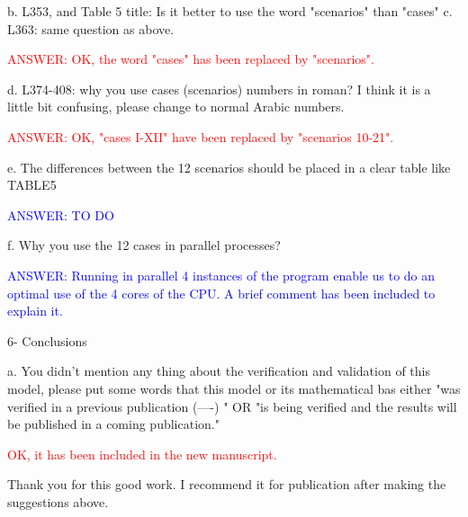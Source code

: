 \documentclass[a4paper]{article}
\begin{document}
b. L353, and Table 5 title: Is it better to use the word "scenarios" than "cases"
c. L363: same question as above.

\textcolor{red}{ANSWER: OK, the word "cases" has been replaced by "scenarios".}

d. L374-408: why you use cases (scenarios) numbers in roman? I think it is a little bit confusing, please change to normal Arabic numbers.

\textcolor{red}{ANSWER: OK, "cases I-XII" have been replaced by "scenarios
10-21".}

e. The differences between the 12 scenarios should be placed in a clear table like TABLE5

\textcolor{blue}{ANSWER: TO DO}

f. Why you use the 12 cases in parallel processes?

\textcolor{blue}{ANSWER: Running in parallel 4 instances of the program enable
us to do an optimal use of the 4 cores of the CPU. A brief comment has been
included to explain it.}

6- Conclusions

a. You didn't mention any thing about the verification and validation of this model, please put some words that this model or its mathematical bas either "was verified in a previous publication (----) " OR "is being verified and the results will be published in a coming publication."

\textcolor{red}{OK, it has been included in the new manuscript.}

Thank you for this good work. I recommend it for publication after making the suggestions above. 
\end{document}
